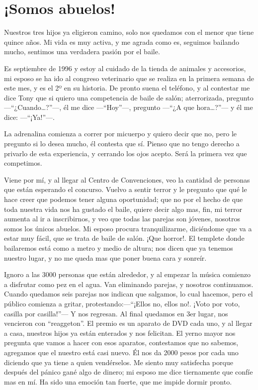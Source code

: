 \documentclass[letterpaper, 12pt]{book}
\begin{document}
\chapter{¡Somos abuelos!}
Nuestros tres hijos ya eligieron camino, solo nos quedamos con el menor que tiene quince años. Mi vida es muy activa, y me agrada como es, seguimos bailando mucho, sentimos una verdadera pasión por el baile.  

Es septiembre de 1996 y estoy al cuidado de la tienda de animales y accesorios, mi esposo se ha ido al congreso veterinario que se realiza en la primera semana de este mes, y es el 2º en su historia. De pronto suena el teléfono, y al contestar me dice Tony que si quiero una competencia de baile de salón; aterrorizada, pregunto ---``¿Cuando\ldots?''---, él me dice ---``Hoy''---, pregunto ---``¿A que hora\ldots?''--- y él me dice: ---``¡Ya!''---.

La adrenalina comienza a correr por micuerpo y quiero decir que no, pero le pregunto si lo desea mucho, él contesta que sí. Pienso que no tengo derecho a privarlo de esta experiencia, y cerrando los ojos acepto. Será la primera vez que competimos.

Viene por mí, y al llegar al Centro de Convenciones, veo la cantidad de personas que están esperando el concurso. Vuelvo a sentir terror y le pregunto que qué le hace creer que podemos tener alguna oportunidad; que no por el hecho de que toda nuestra vida nos ha gustado el baile, quiere decir algo mas, fin, mi terror aumenta al ir a inscribirnos, y veo que todas las parejas son jóvenes, nosotros somos los únicos abuelos. Mi esposo procura tranquilizarme, diciéndome que va a estar muy fácil, que se trata de baile de salón. ¡Que horror!. El templete donde bailaremos está como a metro y medio de altura; nos dicen que ya tenemos nuestro lugar, y no me queda mas que poner buena cara y sonreír. 

Ignoro a las 3000 personas que están alrededor, y al empezar la música comienzo a disfrutar como pez en el agua. Van eliminando parejas, y nosotros continuamos. Cuando quedamos seis parejas nos indican que salgamos, lo cual hacemos, pero el público comienza a gritar, protestando:---``¡Ellos no, ellos no!. ¡Voto por voto, casilla por casilla!''--- Y nos regresan. Al final quedamos en 3er lugar, nos vencieron con ``reaggeton''. El premio es un aparato de DVD cada uno, y al llegar a casa, nuestros hijos ya están enterados y nos felicitan. El yerno mayor nos pregunta que vamos a hacer con esos aparatos, contestamos que no sabemos, agregamos que el nuestro está casi nuevo. Él nos da 2000 pesos por cada uno diciendo que ya tiene a quien vendérselos. Me siento muy satisfecha porque después del pánico gané algo de dinero; mi esposo me dice tiernamente que confíe mas en mí. Ha sido una emoción tan fuerte, que me impide dormir pronto.
\end{document}
